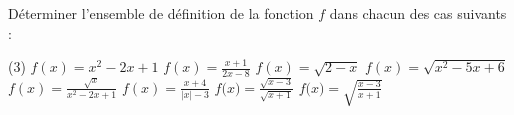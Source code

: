 \documentclass[10pt, a4paper]{article}
\begin{document}
\begin{Application}[][35 min]
Déterminer l'ensemble de définition de la fonction $f$ dans chacun des cas suivants :
\vspace{0.2cm}
\begin{tasks}[label-width=15pt,item-indent=25pt,after-item-skip=5pt](3)
    \task $f(x) = x^2 - 2x + 1$
    \task $f(x) = \frac{x+1}{2x-8}$
    \task $f(x) = \sqrt{2-x}$
    \task $f(x) = \sqrt{x^2 - 5x + 6}$
    \task $f(x) = \frac{\sqrt{x}}{x^2 - 2x + 1}$
    \task $f(x) = \frac{x+4}{|x| - 3}$
    \task $f\big( x \big) = \frac{\sqrt{x-3}}{\sqrt{x+1}}$
    \task $f\big( x \big) = \sqrt{\frac{x-3}{x+1}}$
\end{tasks}
\vspace{0.2cm}
\end{Application}
\end{document}
